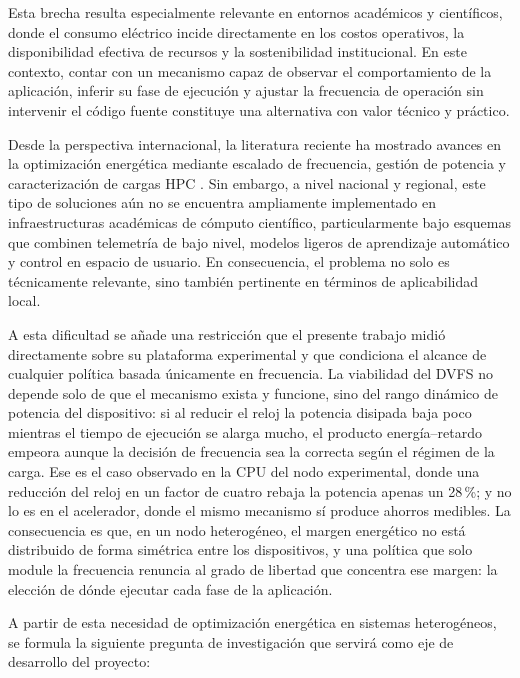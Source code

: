 \documentclass[12pt,oneside,spanish]{book}
\begin{document}
Esta brecha resulta especialmente relevante en entornos académicos y científicos, donde el consumo eléctrico incide directamente en los costos operativos, la disponibilidad efectiva de recursos y la sostenibilidad institucional. En este contexto, contar con un mecanismo capaz de observar el comportamiento de la aplicación, inferir su fase de ejecución y ajustar la frecuencia de operación sin intervenir el código fuente constituye una alternativa con valor técnico y práctico.

Desde la perspectiva internacional, la literatura reciente ha mostrado avances en la optimización energética mediante escalado de frecuencia, gestión de potencia y caracterización de cargas HPC \cite{Simsek2024,Costa2025,Antici2024,Calore2017,Ali2023}. Sin embargo, a nivel nacional y regional, este tipo de soluciones aún no se encuentra ampliamente implementado en infraestructuras académicas de cómputo científico, particularmente bajo esquemas que combinen telemetría de bajo nivel, modelos ligeros de aprendizaje automático y control en espacio de usuario. En consecuencia, el problema no solo es técnicamente relevante, sino también pertinente en términos de aplicabilidad local.

A esta dificultad se añade una restricción que el presente trabajo midió directamente sobre su plataforma experimental y que condiciona el alcance de cualquier política basada únicamente en frecuencia. La viabilidad del DVFS no depende solo de que el mecanismo exista y funcione, sino del rango dinámico de potencia del dispositivo: si al reducir el reloj la potencia disipada baja poco mientras el tiempo de ejecución se alarga mucho, el producto energía--retardo empeora aunque la decisión de frecuencia sea la correcta según el régimen de la carga. Ese es el caso observado en la CPU del nodo experimental, donde una reducción del reloj en un factor de cuatro rebaja la potencia apenas un 28\,\%; y no lo es en el acelerador, donde el mismo mecanismo sí produce ahorros medibles. La consecuencia es que, en un nodo heterogéneo, el margen energético no está distribuido de forma simétrica entre los dispositivos, y una política que solo module la frecuencia renuncia al grado de libertad que concentra ese margen: la elección de dónde ejecutar cada fase de la aplicación.

A partir de esta necesidad de optimización energética en sistemas heterogéneos, se formula la siguiente pregunta de investigación que servirá como eje de desarrollo del proyecto:

\vspace{0.5cm}
\end{document}
